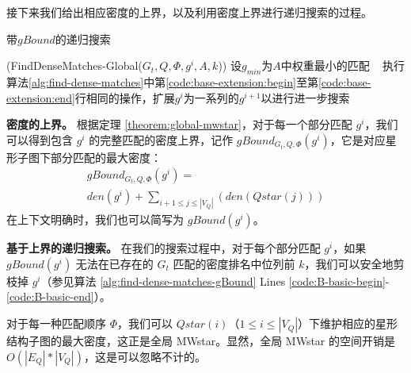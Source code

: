 接下来我们给出相应密度的上界，以及利用密度上界进行递归搜索的过程。


\begin{algorithm}[h!]
    \small
    \caption{带$gBound$的递归搜索}
    \label{alg:find-dense-matches-gBound}
    \iFunc(FindDenseMatches-Global{(}$G_t, Q, \Phi, g^i, A, k${)})
    {
    设$g_{min}$为$A$中权重最小的匹配 \
    执行算法\ref{alg:find-dense-matches}中第\ref{code:base-extension:begin}至第\ref{code:base-extension:end}行相同的操作，扩展$g^i$为一系列的$g^{i+1}$以进行进一步搜索 \\
    \Return
    }
\end{algorithm}

\textbf{密度的上界。} 根据定理 \ref{theorem:global-mwstar}，对于每一个部分匹配 $g^i$，我们可以得到包含 $g^i$ 的完整匹配的密度上界，记作 $gBound_{G_t, Q, \Phi}(g^i)$，它是对应星形子图下部分匹配的最大密度：
  \begin{equation*}
	\begin{multlined}
	 gBound_{G_t, Q, \Phi}(g^i) =  \\ den(g^i) + \sum\nolimits_{i+1\leq j\leq |V_Q|} \left(den(Qstar(j))\right)
	\end{multlined}
  \end{equation*}
  在上下文明确时，我们也可以简写为 $gBound(g^i)$。
  
  \textbf{基于上界的递归搜索。} 在我们的搜索过程中，对于每个部分匹配 $g^i$，如果 $gBound(g^i)$ 无法在已存在的 $G_t$ 匹配的密度排名中位列前 $k$，我们可以安全地剪枝掉 $g^i$（参见算法 \ref{alg:find-dense-matches-gBound}  Lines \ref{code:B-basic-begin}-\ref{code:B-basic-end}）。
  
  对于每一种匹配顺序 $\Phi$，我们可以 $Qstar(i)$（$1 \leq i \leq |V_Q|$）下维护相应的星形结构子图的最大密度，这正是全局 MWstar。显然，全局 MWstar 的空间开销是 $O(|E_Q|*|V_Q|)$，这是可以忽略不计的。
  
